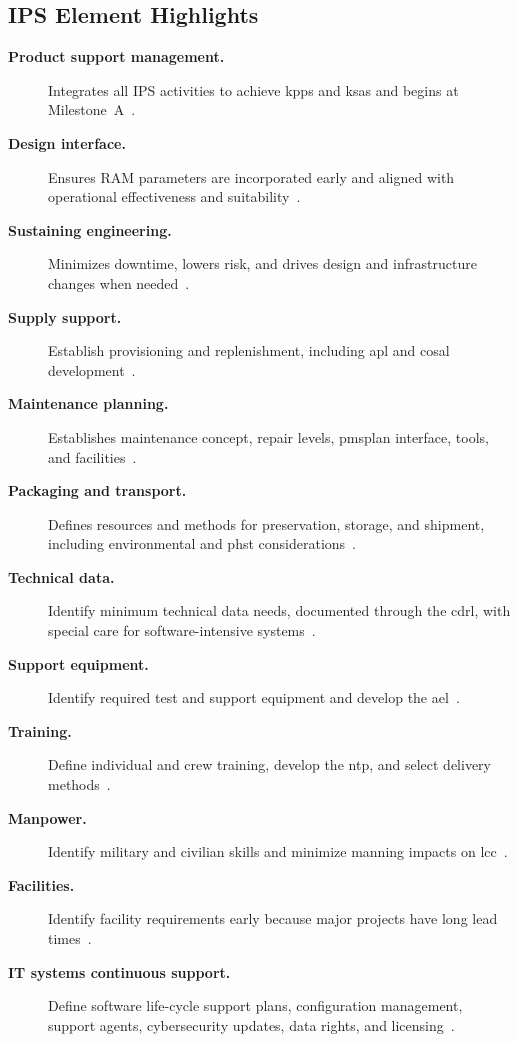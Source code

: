 \documentclass[../main.tex]{subfiles}
\begin{document}
\subsection{IPS Element Highlights}
\begin{description}
  \item[\textbf{Product support management.}] Integrates all IPS activities to achieve \acp{kpp} and \acp{ksa} and begins at Milestone~A~\autocite{edo-3-5-4-acquisition-logistics-2025}.
  \item[\textbf{Design interface.}] Ensures RAM parameters are incorporated early and aligned with operational effectiveness and suitability~\autocite{edo-3-5-4-acquisition-logistics-2025}.
  \item[\textbf{Sustaining engineering.}] Minimizes downtime, lowers risk, and drives design and infrastructure changes when needed~\autocite{edo-3-5-4-acquisition-logistics-2025}.
  \item[\textbf{Supply support.}] Establish provisioning and replenishment, including \ac{apl} and \ac{cosal} development~\autocite{edo-3-5-4-acquisition-logistics-2025}.
  \item[\textbf{Maintenance planning.}] Establishes maintenance concept, repair levels, \ac{pmsplan} interface, tools, and facilities~\autocite{edo-3-5-4-acquisition-logistics-2025}.
  \item[\textbf{Packaging and transport.}] Defines resources and methods for preservation, storage, and shipment, including environmental and \ac{phst} considerations~\autocite{edo-3-5-4-acquisition-logistics-2025}.
  \item[\textbf{Technical data.}] Identify minimum technical data needs, documented through the \ac{cdrl}, with special care for software-intensive systems~\autocite{edo-3-5-4-acquisition-logistics-2025}.
  \item[\textbf{Support equipment.}] Identify required test and support equipment and develop the \ac{ael}~\autocite{edo-3-5-4-acquisition-logistics-2025}.
  \item[\textbf{Training.}] Define individual and crew training, develop the \ac{ntp}, and select delivery methods~\autocite{edo-3-5-4-acquisition-logistics-2025}.
  \item[\textbf{Manpower.}] Identify military and civilian skills and minimize manning impacts on \ac{lcc}~\autocite{edo-3-5-4-acquisition-logistics-2025}.
  \item[\textbf{Facilities.}] Identify facility requirements early because major projects have long lead times~\autocite{edo-3-5-4-acquisition-logistics-2025}.
  \item[\textbf{IT systems continuous support.}] Define software life-cycle support plans, configuration management, support agents, cybersecurity updates, data rights, and licensing~\autocite{edo-3-5-4-acquisition-logistics-2025,DoDI5000-91}.
\end{description}
\end{document}
